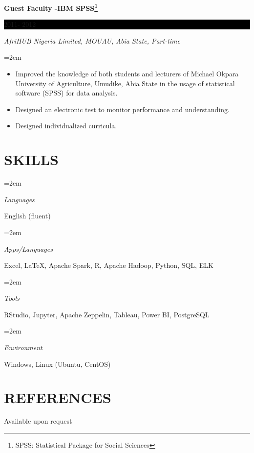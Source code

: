 \documentclass[paper=a4,fontsize=10pt]{scrartcl} %
\newlength{\spacebox}
\newcommand{\sepspace}{\vspace*{1em}}       %
\newcommand{\NewPart}[1]{\section*{\uppercase{#1}}}
\newcommand{\PersonalEntry}[2]{
        \noindent\hangindent=2em\hangafter=0 %
        \parbox{\spacebox}{        %
        \textit{#1}}               %
        \hspace{1.5em} #2 \par}    %
\newcommand{\SkillsEntry}[2]{      %
        \noindent\hangindent=2em\hangafter=0 %
        \parbox{\spacebox}{        %
        \textit{#1}}               %
        \hspace{1.5em} #2 \par}    %
\newcommand{\EducationEntry}[4]{
        \noindent \textbf{#1} \hfill      %
        \colorbox{Black}{%
            \parbox{6em}{%
            \hfill\color{White}#2}} \par  %
        \noindent \textit{#3} \par        %
        \noindent\hangindent=2em\hangafter=0 \small #4 %
        \normalsize \par}
\begin{document}
\sepspace


\EducationEntry{Guest Faculty -IBM SPSS\footnote{SPSS: Statistical Package for Social Sciences}}{2011- 2012}{AfriHUB Nigeria Limited, MOUAU, Abia State, Part-time}{
	\begin{itemize}
		\item Improved the knowledge of both students and lecturers of Michael Okpara University of Agriculture, Umudike, Abia State in the usage of statistical software (SPSS) for data analysis.
		\item Designed an electronic test to monitor performance and understanding.
		\item Designed individualized curricula.
	\end{itemize}}






\NewPart{Skills}{}

\SkillsEntry{Languages}{English (fluent)}

\SkillsEntry{Apps/Languages}{Excel, \LaTeX, Apache Spark, \textsc{R}, Apache Hadoop, Python, SQL, ELK}

\SkillsEntry{Tools}{RStudio, Jupyter, Apache Zeppelin, Tableau, Power BI, PostgreSQL}
\SkillsEntry{Environment}{Windows, Linux (Ubuntu, CentOS)}



\NewPart{References}{}
Available upon request
\end{document}
